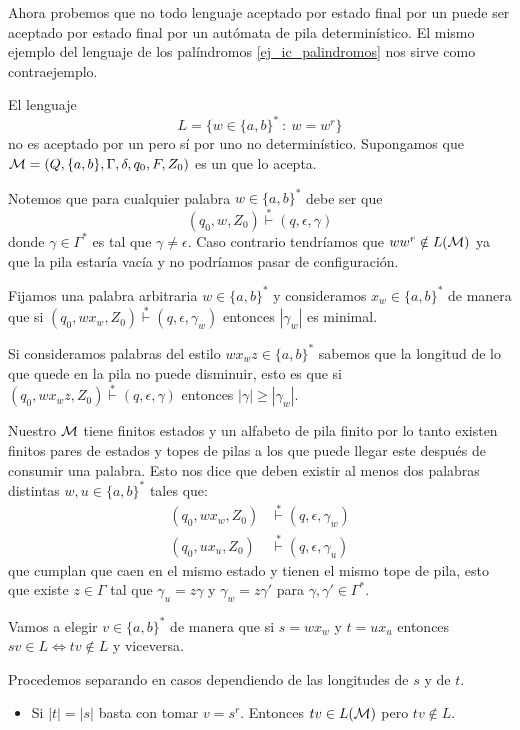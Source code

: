 \documentclass[tesis.tex]{subfiles}
\begin{document}
Ahora probemos que no todo lenguaje aceptado por estado final por un \APND puede ser aceptado por estado final por un autómata de pila determinístico.
El mismo ejemplo del lenguaje de los palíndromos \ref{ej_ic_palindromos} nos sirve como contraejemplo.
\begin{ej}
	El lenguaje 
	\[
	L = \{ w \in \{ a,b \}^*  \ : \ w = w^r \}
	\]
	no es aceptado por un \APD pero sí por uno no determinístico. 
	Supongamos que ${\cal {M}} = (Q, \{ a, b \}, \Gamma, \delta, q_0, F, Z_0)$ es un \APD que lo acepta. 
	
	
	Notemos que para cualquier palabra $w \in \{ a,b \}^*$ debe ser que
	\[
	(q_{0},w,Z_{0}) \overset{*}{\vdash} (q, \epsilon, \gamma)
	\]
	donde $\gamma \in \Gamma^*$ es tal que $\gamma \neq \epsilon$.
	Caso contrario tendríamos que $ww^r \notin L(\cal M)$ ya que la pila estaría vacía y no podríamos pasar de configuración.
	
	Fijamos una palabra arbitraria $w \in \{ a,b \}^*$ y consideramos $x_{w} \in \{ a, b\}^*$ de manera que si
	$(q_{0}, wx_{w}, Z_{0}) \overset{*}{\vdash} (q, \epsilon, \gamma_{w})$ entonces $|\gamma_{w}|$ es minimal.
	
	
	Si consideramos palabras del estilo $wx_wz \in \{a,b\}^*$ sabemos que la longitud de lo que quede en la pila no puede disminuir, esto es que si $(q_{0}, wx_{w}z, Z_{0}) \overset{*}{\vdash} (q, \epsilon, \gamma)$ entonces $|\gamma| \ge |\gamma_{w}|$.
	
	Nuestro \APD $\cal M$ tiene finitos estados y un alfabeto de pila finito por lo tanto existen finitos pares de estados y topes de pilas a los que puede llegar este \APD después de consumir una palabra.
	Esto nos dice que deben existir al menos dos palabras distintas $w, u \in \{ a, b\}^*$ tales que:
	\begin{align*}
		(q_{0}, wx_{w}, Z_{0}) & \overset{*}{\vdash} (q, \epsilon, \gamma_{w}) \\
		(q_{0}, ux_{u}, Z_{0}) & \overset{*}{\vdash} (q, \epsilon, \gamma_{u})
	\end{align*}
	que cumplan que caen en el mismo estado y tienen el mismo tope de pila, esto que existe $z \in \Gamma$ tal que $\gamma_{u} = z \gamma$ y $\gamma_{w} = z \gamma'$ para $\gamma, \gamma' \in \Gamma^{*}$.
	
	
	Vamos a elegir $v \in \{ a,b\}^*$ de manera que si $s = wx_{w}$ y $t = ux_{u}$ entonces $sv \in L \iff tv \notin L$ y viceversa.
	
	Procedemos separando en casos dependiendo de las longitudes de $s$ y de $t$.
	\begin{itemize}
		\item Si $|t|=|s|$ basta con tomar $v=s^r$. 
		Entonces $tv \in L({\cal M})$ pero $tv \notin L$.
		

\end{itemize}
\end{ej}
\end{document}
